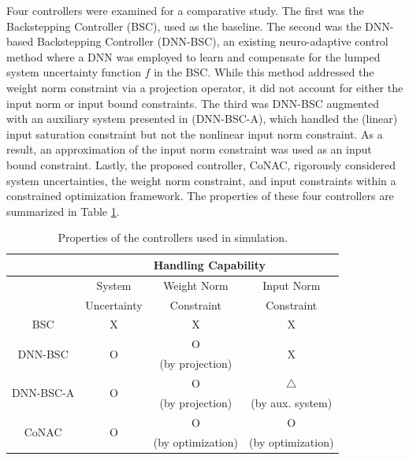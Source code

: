 Four controllers were examined for a comparative study. 
The first was the Backstepping Controller (BSC), used as the baseline. 
The second was the DNN-based Backstepping Controller (DNN-BSC), an existing neuro-adaptive control method where a DNN was employed to learn and compensate for the lumped system uncertainty function $f$ in the BSC. 
While this method addressed the weight norm constraint via a projection operator, it did not account for either the input norm or input bound constraints. 
The third was DNN-BSC augmented with an auxiliary system presented in \cite{RN95,RN46,RN60} (DNN-BSC-A), which handled the (linear) input saturation constraint but not the nonlinear input norm constraint. 
As a result, an approximation of the input norm constraint was used as an input bound constraint. 
Lastly, the proposed controller, CoNAC, rigorously considered system uncertainties, the weight norm constraint, and input constraints within a constrained optimization framework. The properties of these four controllers are summarized in Table \ref{chap4:table:ctrl}.

\begin{table}[!t]
    \renewcommand{\arraystretch}{1.3}
    \caption{Properties of the controllers used in simulation.}
    \label{chap4:table:ctrl}
    \centering
    \begin{tabular}{|c||c|c|c|}
    \hline
    & \multicolumn{3}{c|}{Handling Capability}\\
    \hline
    & System & Weight Norm & Input Norm\\
    &  Uncertainty & Constraint & Constraint\\
    \hline 
    BSC     & X & X & X\\
    \hline
    \multirow{2}{*}{DNN-BSC}     & \multirow{2}{*}{O} & O & \multirow{2}{*}{X}\\
         &  & (by projection) & \\
    \hline
    \multirow{2}{*}{DNN-BSC-A}   & \multirow{2}{*}{O} & O & $\triangle$ \\
       &  & (by projection) &  (by aux. system)\\
    \hline
    \multirow{2}{*}{CoNAC}     &  \multirow{2}{*}{O} & O & O\\
         &  & (by optimization) & (by optimization)\\
    \hline
    \end{tabular}
\end{table}

